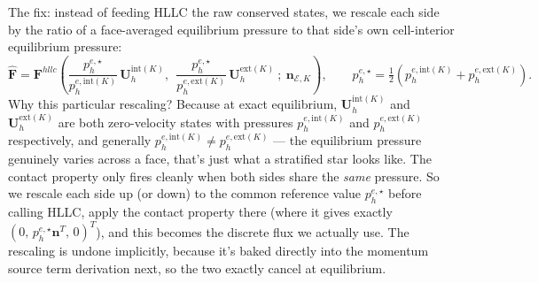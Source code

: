 The fix: instead of feeding HLLC the raw conserved states, we rescale each side by the ratio of a face-averaged equilibrium pressure to that side's own cell-interior equilibrium pressure:
\[
	\widehat{\mathbf{F}} = \mathbf{F}^{hllc}\left(\frac{p_h^{e,\star}}{p_h^{e,\mathrm{int}(K)}}\,\mathbf{U}_h^{\mathrm{int}(K)},\ \ \frac{p_h^{e,\star}}{p_h^{e,\mathrm{ext}(K)}}\,\mathbf{U}_h^{\mathrm{ext}(K)}\ ;\ \mathbf{n}_{\mathcal{E},K}\right), \qquad p_h^{e,\star} = \tfrac12\left(p_h^{e,\mathrm{int}(K)} + p_h^{e,\mathrm{ext}(K)}\right).
\]
Why this particular rescaling? Because at exact equilibrium, $\mathbf{U}_h^{\mathrm{int}(K)}$ and $\mathbf{U}_h^{\mathrm{ext}(K)}$ are both zero-velocity states with pressures $p_h^{e,\mathrm{int}(K)}$ and $p_h^{e,\mathrm{ext}(K)}$ respectively, and generally $p_h^{e,\mathrm{int}(K)} \ne p_h^{e,\mathrm{ext}(K)}$ — the equilibrium pressure genuinely varies across a face, that's just what a stratified star looks like. The contact property only fires cleanly when both sides share the \emph{same} pressure. So we rescale each side up (or down) to the common reference value $p_h^{e,\star}$ before calling HLLC, apply the contact property there (where it gives exactly $(0,\,p_h^{e,\star}\mathbf{n}^T,\,0)^T$), and this becomes the discrete flux we actually use. The rescaling is undone implicitly, because it's baked directly into the momentum source term derivation next, so the two exactly cancel at equilibrium.

